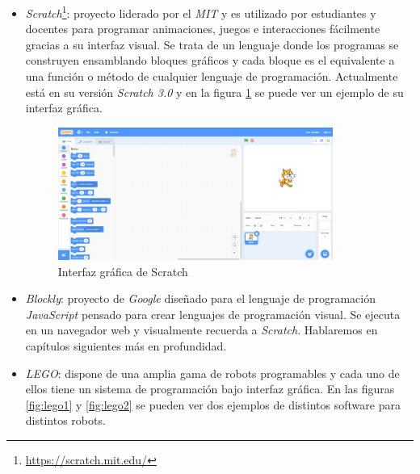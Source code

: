 \begin{itemize}
    \item \textit{Scratch}\footnote{\url{https://scratch.mit.edu/}}: proyecto liderado por el \textit{MIT} y es utilizado por estudiantes y docentes para programar animaciones, juegos e interacciones fácilmente gracias a su interfaz visual. Se trata de un lenguaje donde los programas se construyen ensamblando bloques gráficos y cada bloque es el equivalente a una función o método de cualquier lenguaje de programación. Actualmente está en su versión \textit{Scratch 3.0} y en la figura \ref{fig:scratch} se puede ver un ejemplo de su interfaz gráfica. 
    \begin{figure}[H]
    \centering
    \includegraphics[width=0.85\textwidth]{img/scratch.jpg}
    \caption{Interfaz gráfica de Scratch} \label{fig:scratch}
    \end{figure}
    
    \item \textit{Blockly}: proyecto de \textit{Google} diseñado para el lenguaje de programación \textit{JavaScript} pensado para crear lenguajes de programación visual. Se ejecuta en un navegador web y visualmente recuerda a \textit{Scratch}. Hablaremos en capítulos siguientes más en profundidad. 
    
    \item \textit{LEGO}: dispone de una amplia gama de robots programables y cada uno de ellos tiene un sistema de programación bajo interfaz gráfica. En las figuras \ref{fig:lego1} y \ref{fig:lego2} se pueden ver dos ejemplos de distintos software para distintos robots.  
    

\end{itemize}
